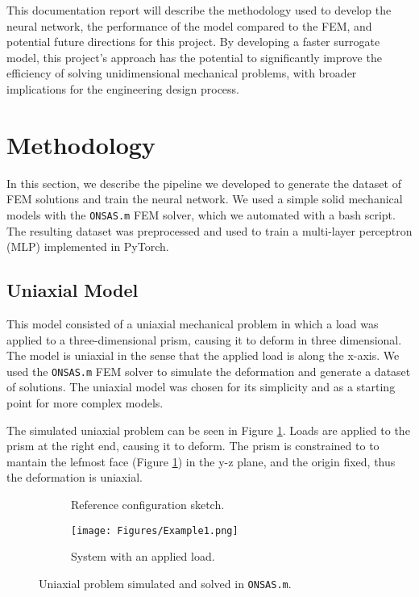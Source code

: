 \documentclass[oneside,a4paper,english,links]{amca}
\begin{document}
This documentation report will describe the methodology used to develop the neural network, the performance of the model compared to the FEM, and potential future directions for this project. By developing a faster surrogate model, this project's approach has the potential to significantly improve the efficiency of solving unidimensional mechanical problems, with broader implications for the engineering design process.

\section{Methodology}
In this section, we describe the pipeline we developed to generate the dataset of FEM solutions and train the neural network. We used a simple solid mechanical models with the \texttt{ONSAS.m} FEM solver, which we automated with a bash script. The resulting dataset was preprocessed and used to train a multi-layer perceptron (MLP) implemented in PyTorch.

\subsection{Uniaxial Model}
This model consisted of a uniaxial mechanical problem in which a load was applied to a three-dimensional prism, causing it to deform in three dimensional. The model is uniaxial in the sense that the applied load is along the x-axis. We used the \texttt{ONSAS.m} FEM solver to simulate the deformation and generate a dataset of solutions. The uniaxial model was chosen for its simplicity and as a starting point for more complex models.

The simulated uniaxial problem can be seen in Figure \ref{fig:uniaxial_model}. Loads are applied to the prism at the right end, causing it to deform. The prism is constrained to to mantain the lefmost face (Figure \ref{fig:uniaxial_model}) in the y-z plane, and the origin fixed, thus the deformation is uniaxial.

\begin{figure}[ht]
	\centering
	\begin{subfigure}[b]{0.48\textwidth}
	\def\svgwidth{\textwidth}
	
	\caption{Reference configuration sketch.}
	\end{subfigure}
	\hfill
	\begin{subfigure}[b]{0.48\textwidth}
	\centering
		\texttt{[image: Figures/Example1.png]}
	\caption{System with an applied load.}
	\end{subfigure}
	\caption{Uniaxial problem simulated and solved in \texttt{ONSAS.m}.}
	\label{fig:uniaxial_model}
\end{figure}
\end{document}
